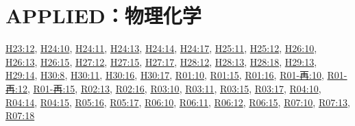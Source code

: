 \section{APPLIED：物理化学}
\hyperref[q:h23-reg-applied-12]{H23:12}, \hyperref[q:h24-reg-applied-10]{H24:10}, \hyperref[q:h24-reg-applied-11]{H24:11}, \hyperref[q:h24-reg-applied-13]{H24:13}, \hyperref[q:h24-reg-applied-14]{H24:14}, \hyperref[q:h24-reg-applied-17]{H24:17}, \hyperref[q:h25-reg-applied-11]{H25:11}, \hyperref[q:h25-reg-applied-12]{H25:12}, \hyperref[q:h26-reg-applied-10]{H26:10}, \hyperref[q:h26-reg-applied-13]{H26:13}, \hyperref[q:h26-reg-applied-15]{H26:15}, \hyperref[q:h27-reg-applied-12]{H27:12}, \hyperref[q:h27-reg-applied-15]{H27:15}, \hyperref[q:h27-reg-applied-17]{H27:17}, \hyperref[q:h28-reg-applied-12]{H28:12}, \hyperref[q:h28-reg-applied-13]{H28:13}, \hyperref[q:h28-reg-applied-18]{H28:18}, \hyperref[q:h29-reg-applied-13]{H29:13}, \hyperref[q:h29-reg-applied-14]{H29:14}, \hyperref[q:h30-reg-applied-08]{H30:8}, \hyperref[q:h30-reg-applied-11]{H30:11}, \hyperref[q:h30-reg-applied-16]{H30:16}, \hyperref[q:h30-reg-applied-17]{H30:17}, \hyperref[q:r01-reg-applied-10]{R01:10}, \hyperref[q:r01-reg-applied-15]{R01:15}, \hyperref[q:r01-reg-applied-16]{R01:16}, \hyperref[q:r01-ret-applied-10]{R01-再:10}, \hyperref[q:r01-ret-applied-12]{R01-再:12}, \hyperref[q:r01-ret-applied-15]{R01-再:15}, \hyperref[q:r02-reg-applied-13]{R02:13}, \hyperref[q:r02-reg-applied-16]{R02:16}, \hyperref[q:r03-reg-applied-10]{R03:10}, \hyperref[q:r03-reg-applied-11]{R03:11}, \hyperref[q:r03-reg-applied-15]{R03:15}, \hyperref[q:r03-reg-applied-17]{R03:17}, \hyperref[q:r04-reg-applied-10]{R04:10}, \hyperref[q:r04-reg-applied-14]{R04:14}, \hyperref[q:r04-reg-applied-15]{R04:15}, \hyperref[q:r05-reg-applied-16]{R05:16}, \hyperref[q:r05-reg-applied-17]{R05:17}, \hyperref[q:r06-reg-applied-10]{R06:10}, \hyperref[q:r06-reg-applied-11]{R06:11}, \hyperref[q:r06-reg-applied-12]{R06:12}, \hyperref[q:r06-reg-applied-15]{R06:15}, \hyperref[q:r07-reg-applied-10]{R07:10}, \hyperref[q:r07-reg-applied-13]{R07:13}, \hyperref[q:r07-reg-applied-18]{R07:18}
